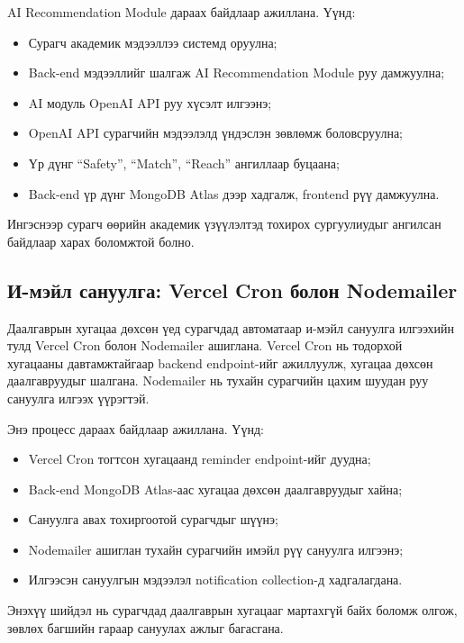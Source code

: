 AI Recommendation Module дараах байдлаар ажиллана. Үүнд:

\begin{itemize}
    \item Сурагч академик мэдээллээ системд оруулна;
    \item Back-end мэдээллийг шалгаж AI Recommendation Module руу дамжуулна;
    \item AI модуль OpenAI API руу хүсэлт илгээнэ;
    \item OpenAI API сурагчийн мэдээлэлд үндэслэн зөвлөмж боловсруулна;
    \item Үр дүнг ``Safety'', ``Match'', ``Reach'' ангиллаар буцаана;
    \item Back-end үр дүнг MongoDB Atlas дээр хадгалж, frontend рүү дамжуулна.
\end{itemize}

Ингэснээр сурагч өөрийн академик үзүүлэлтэд тохирох сургуулиудыг
ангилсан байдлаар харах боломжтой болно.

\subsection*{И-мэйл сануулга: Vercel Cron болон Nodemailer}

Даалгаврын хугацаа дөхсөн үед сурагчдад автоматаар и-мэйл сануулга
илгээхийн тулд Vercel Cron болон Nodemailer ашиглана. Vercel Cron нь
тодорхой хугацааны давтамжтайгаар backend endpoint-ийг ажиллуулж,
хугацаа дөхсөн даалгавруудыг шалгана. Nodemailer нь тухайн сурагчийн
цахим шуудан руу сануулга илгээх үүрэгтэй.

Энэ процесс дараах байдлаар ажиллана. Үүнд:

\begin{itemize}
    \item Vercel Cron тогтсон хугацаанд reminder endpoint-ийг дуудна;
    \item Back-end MongoDB Atlas-аас хугацаа дөхсөн даалгавруудыг хайна;
    \item Сануулга авах тохиргоотой сурагчдыг шүүнэ;
    \item Nodemailer ашиглан тухайн сурагчийн имэйл рүү сануулга илгээнэ;
    \item Илгээсэн сануулгын мэдээлэл notification collection-д хадгалагдана.
\end{itemize}

Энэхүү шийдэл нь сурагчдад даалгаврын хугацааг мартахгүй байх боломж
олгож, зөвлөх багшийн гараар сануулах ажлыг багасгана.


